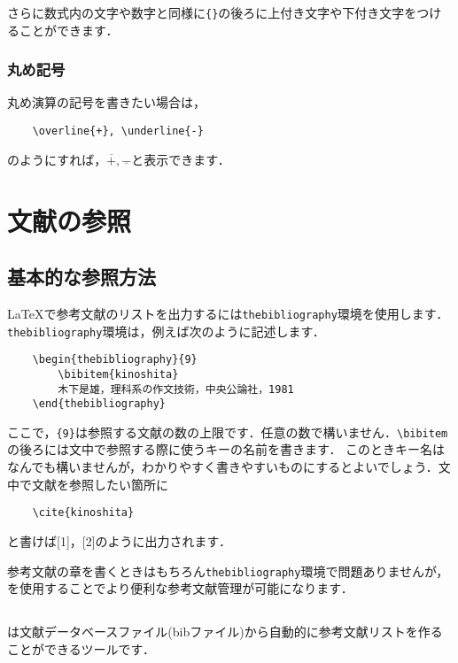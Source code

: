 \documentclass[a4paper, 11pt, uplatex]{jsreport}
\numberwithin{equation}{section}
\theoremstyle{definition}
\begin{document}
さらに数式内の文字や数字と同様に\verb|{}|の後ろに上付き文字や下付き文字をつけることができます．

\subsection{丸め記号}

丸め演算の記号を書きたい場合は，
\begin{verbatim}
    \overline{+}, \underline{-}
\end{verbatim}
のようにすれば，$\overline{+},\underline{-}$と表示できます．



\chapter{文献の参照}


\section{基本的な参照方法}

\LaTeX で参考文献のリストを出力するには\verb|thebibliography|環境を使用します\cite{bibunsyo}．
\verb|thebibliography|環境は，例えば次のように記述します．
\begin{verbatim}
    \begin{thebibliography}{9}
        \bibitem{kinoshita}
        木下是雄，理科系の作文技術，中央公論社，1981
    \end{thebibliography}
\end{verbatim}

ここで，\verb|{9}|は参照する文献の数の上限です．任意の数で構いません．\verb|\bibitem|の後ろには文中で参照する際に使うキーの名前を書きます．
このときキー名はなんでも構いませんが，わかりやすく書きやすいものにするとよいでしょう．文中で文献を参照したい箇所に
\begin{verbatim}
    \cite{kinoshita}
\end{verbatim}
と書けば[1]，[2]のように出力されます．

参考文献の章を書くときはもちろん\verb|thebibliography|環境で問題ありませんが，
\BibTeX を使用することでより便利な参考文献管理が可能になります．


\section{\BibTeX}

 {\BibTeX}は文献データベースファイル(bibファイル)から自動的に参考文献リストを作ることができるツールです\cite{bibunsyo}．
\end{document}
